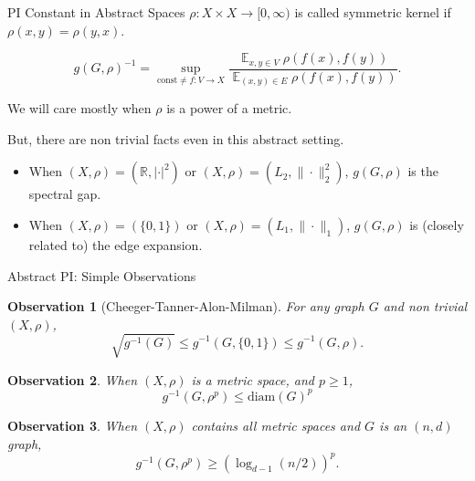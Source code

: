\documentclass[compress]{beamer}
\DeclareMathOperator*{\Avg}{\mathbb{E}}
\newcommand{\diam}{\mathrm{diam}}
\newtheorem{observation}{Observation}
\begin{document}
\begin{frame}{PI Constant in Abstract Spaces}
\onslide<+->
$\rho:X\times X \to  [0,\infty)$ is called symmetric kernel if $\rho(x,y)=\rho(y,x)$.

\begin{definition}[PI Constant]
\[ g(G,\rho)^{-1} = \sup_{\text{const} \ne f:V\to  X } \frac{\Avg_{x,y\in V} \rho(f(x),f(y)) }{\Avg_{(x,y)\in E} \rho(f(x),f(y))}. \]
\end{definition}

We will care mostly when $\rho$ is a power of a metric.

But, there are non trivial facts even in this abstract setting.

\onslide<+->

\begin{example}
\begin{itemize}
\item When $(X,\rho)=(\mathbb R, | \cdot |^2)$ or $(X,\rho)=(L_2, \| \cdot \|_2^2)$,
$g(G,\rho)$ is the spectral gap.
\item  When $(X,\rho)=(\{0,1\})$ or $(X,\rho)=(L_1, \|\cdot \|_1)$, 
$g(G,\rho)$ is (closely related to) the edge expansion. 
\end{itemize}
\end{example}
\end{frame}

\begin{frame}{Abstract PI: Simple Observations}
\onslide<+->
\begin{observation}[Cheeger-Tanner-Alon-Milman]
For any graph $G$ and non trivial $(X,\rho)$,  
\[ \sqrt{ g^{-1}(G)} \le g^{-1}(G,\{0,1\})\le g^{-1}(G,\rho). \]
\end{observation}

\onslide<+->
\begin{observation}
When $(X,\rho)$ is a metric space, and $p\ge 1$,
\[ g^{-1}(G,\rho^p)\le \diam(G)^p \]
\end{observation}

\onslide<+->
\begin{observation}
When $(X,\rho)$ contains all metric spaces and $G$ is an $(n,d)$ graph,
\[ g^{-1}(G,\rho^p) \ge (\log_{d-1}(n/2))^p .\]
\end{observation}
\end{frame}
\end{document}
